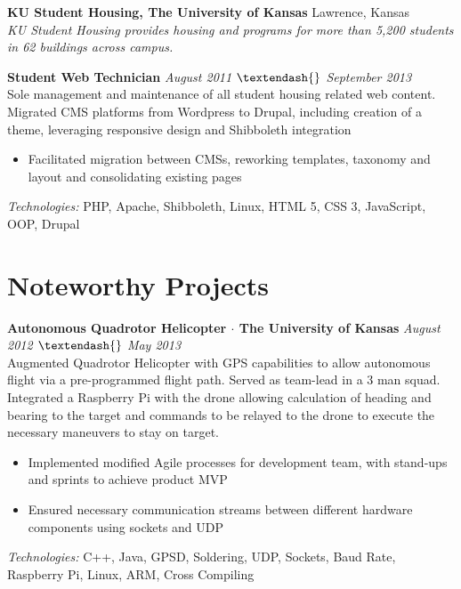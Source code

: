\documentclass[10pt]{article}
\begin{document}
\textbf{KU Student Housing, The University of Kansas} \hfill Lawrence, Kansas \\
\textit{KU Student Housing provides housing and programs for more than 5,200 students in 62 buildings across campus.} \\
\begin{addmargin}[1em]{0em}
  \textbf{Student Web Technician} \hfill \textit{August 2011 $\textendash{}$ September 2013} \\
  Sole management and maintenance of all student housing related web content. Migrated CMS platforms from Wordpress to Drupal, including creation of a theme, leveraging responsive design and Shibboleth integration \\
  \vspace{-1em}
  \begin{itemize}
    \item Facilitated migration between CMSs, reworking templates, taxonomy and layout and consolidating existing pages
  \end{itemize}
  \textit{Technologies:} PHP, Apache, Shibboleth, Linux, HTML 5, CSS 3, JavaScript, OOP, Drupal
\end{addmargin}

\section*{Noteworthy Projects}
\textbf{Autonomous Quadrotor Helicopter $\cdot$ The University of Kansas} \hfill \textit{August 2012  $\textendash{}$ May 2013} \\
Augmented Quadrotor Helicopter with GPS capabilities to allow autonomous flight via a pre-programmed flight path. Served as team-lead in a 3 man squad. Integrated a Raspberry Pi with the drone allowing calculation of heading and bearing to the target and commands to be relayed to the drone to execute the necessary maneuvers to stay on target.
\begin{itemize}
  \item Implemented modified Agile processes for development team, with stand-ups and sprints to achieve product MVP
  \item Ensured necessary communication streams between different hardware components using sockets and UDP
\end{itemize}
\textit{Technologies:} C++, Java, GPSD, Soldering, UDP, Sockets, Baud Rate, Raspberry Pi, Linux, ARM, Cross Compiling
\end{document}
